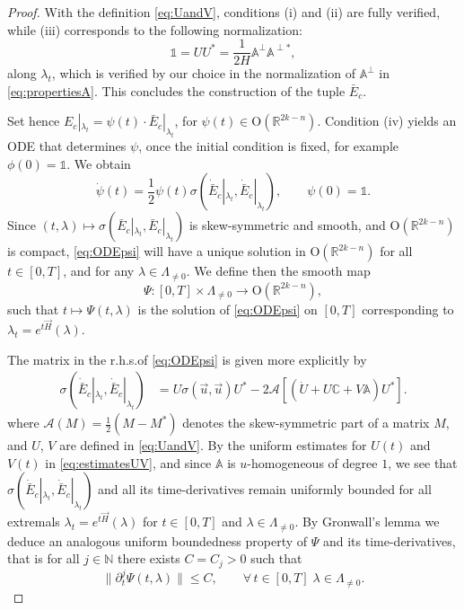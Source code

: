 \documentclass[11pt,a4paper]{article}
\theoremstyle{plain}
\theoremstyle{definition}
\theoremstyle{remark}
\numberwithin{equation}{section}
\newcommand{\R}{\mathbb{R}} %
\newcommand{\N}{\mathbb{N}} %
\newcommand{\A}{\mathbb{A}}
\newcommand{\C}{\mathbb{C}}
\begin{document}
\begin{proof}
With the definition \eqref{eq:UandV}, conditions (i) and (ii) are fully verified, while (iii) corresponds to the following normalization:
\begin{equation}
\mathbb{1} = UU^* = \frac{1}{2H}\A^{\perp} \A^{\perp *},
\end{equation}
along $\lambda_t$, which is verified by our choice in the normalization of $\A^\perp$ in \eqref{eq:propertiesA}. This concludes the construction of the tuple $\bar{E}_c$.

Set hence $E_c|_{\lambda_t} = \psi(t)\cdot \bar{E}_c|_{\lambda_t}$, for $\psi(t) \in \mathrm{O}(\R^{2k-n})$. Condition (iv) yields an ODE that determines $\psi$, once the initial condition is fixed, for example $\phi(0) = \mathbb{1}$. We obtain
\begin{equation}\label{eq:ODEpsi}
\dot{\psi}(t) = \frac{1}{2}\psi(t)\sigma(\dot{\bar{E}}_c|_{\lambda_t},\dot{\bar{E}}_c|_{\lambda_t}), \qquad \psi(0)=\mathbb{1}.
\end{equation}
Since $(t,\lambda)\mapsto \sigma(\bar{E}_c|_{\lambda_t},\bar{E}_c|_{\lambda_t})$ is skew-symmetric and smooth, and $\mathrm{O}(\R^{2k-n})$ is compact, \eqref{eq:ODEpsi} will have a unique solution in $\mathrm{O}(\R^{2k-n})$ for all $t\in [0,T]$, and for any $\lambda \in \Lambda_{\neq 0}$. We define then the smooth map
\begin{equation}
\Psi : [0,T]\times \Lambda_{\neq 0} \to \mathrm{O}(\R^{2k-n}),
\end{equation}
such that $t\mapsto \Psi(t,\lambda)$ is the solution of \eqref{eq:ODEpsi} on $[0,T]$ corresponding to $\lambda_t = e^{t\vec{H}}(\lambda)$.

The matrix in the r.h.s.\@ of \eqref{eq:ODEpsi} is given more explicitly by\label{L: check this}
\begin{align}
\sigma(\dot{\bar{E}}_c|_{\lambda_t},\dot{\bar{E}}_c|_{\lambda_t}) & = U\sigma(\vec{u},\vec{u}) U^* -2\mathcal{A}\left[(\dot{U}+U\C+V\A)U^*\right].
\end{align}
where $\mathcal{A}(M)=\tfrac{1}{2}(M-M^*)$ denotes the skew-symmetric part of a matrix $M$, and $U$, $V$ are defined in \eqref{eq:UandV}. By the uniform estimates for $U(t)$ and $V(t)$ in \eqref{eq:estimatesUV}, and since $\A$ is $u$-homogeneous of degree $1$, we see that $\sigma(\dot{\bar{E}}_c|_{\lambda_t},\dot{\bar{E}}_c|_{\lambda_t})$ and all its time-derivatives remain uniformly bounded for all extremals $\lambda_t =e^{t\vec{H}}(\lambda)$ for $t\in [0,T]$ and $\lambda \in \Lambda_{\neq 0}$. By Gronwall's lemma we deduce an analogous uniform boundedness property of $\Psi$ and its time-derivatives, that is for all $j\in \N$ there exists $C=C_j >0$ such that
\begin{equation}
\|\partial_t^{j}\Psi(t,\lambda)\| \leq C, \qquad \forall\, t\in [0,T]\;  \lambda \in \Lambda_{\neq 0}.
\end{equation}


\end{proof}
\end{document}
